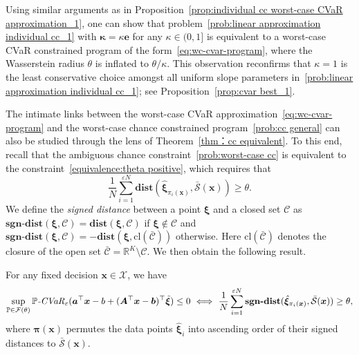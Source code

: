 \documentclass[nonblindrev]{informs2017}
\newcommand{\bmt}[1]{\tilde{\bm{#1}}}
\newcommand{\bmh}[1]{\hat{\bm{#1}}}
\newcommand{\1}[1]{\mathds{1}{\left(#1\right)}}
\begin{document}
\begin{remark}
Using similar arguments as in Proposition~\ref{prop:individual cc worst-case CVaR approximation_1}, one can show that problem~\eqref{prob:linear approximation individual cc_1} with $\bm \kappa=\kappa\bm e$ for any $\kappa\in (0,1]$ is equivalent to a worst-case CVaR constrained program of the form~\eqref{eq:wc-cvar-program}, where the Wasserstein radius $\theta$ is inflated to $\theta/\kappa$. This observation reconfirms that $\kappa=1$ is the least conservative choice amongst all uniform slope parameters in~\eqref{prob:linear approximation individual cc_1}; see Proposition~\ref{prop:cvar best_1}.
\end{remark}

The intimate links between the worst-case CVaR approximation~\eqref{eq:wc-cvar-program} and the worst-case chance constrained program~\eqref{prob:cc general} can also be studied through the lens of Theorem~\ref{thm：cc equivalent}. To this end, recall that the ambiguous chance constraint~\eqref{prob:worst-case cc} is equivalent to the constraint~\eqref{equivalence:theta positive}, which requires that
\begin{equation*}
\dfrac{1}{N}\sum_{i = 1}^{\varepsilon N} \mathbf{dist}(\bmh{\xi}_{\pi_i(\bm{x})}, \bar{\mathcal{S}}(\bm{x})) \ge \theta.
\end{equation*}
We define the \emph{signed distance} between a point $\bm{\xi}$ and a closed set $\mathcal{C}$ as $\mathbf{sgn\textbf{-}dist} (\bm{\xi}, \mathcal{C}) = \mathbf{dist} (\bm{\xi}, \mathcal{C})$ if $\bm{\xi} \notin \mathcal{C}$ and $\mathbf{sgn\textbf{-}dist} (\bm{\xi}, \mathcal{C}) = -\mathbf{dist} (\bm{\xi}, \text{cl}(\bar{\mathcal{C}}))$ otherwise. Here $\text{cl}(\bar{\mathcal{C}})$ denotes the closure of the open set $\bar{\mathcal{C}} = \mathbb{R}^K \setminus \mathcal{C}$. We then obtain the following result.

\begin{proposition}\label{prop:CVaR equivalence_1}
For any fixed decision $\bm{x} \in \mathcal{X}$, we have
$$
\sup_{\mathbb{P} \in \mathcal{F}(\theta)} \mathbb{P}\text{\emph{-CVaR}}_{\varepsilon}(\bm{a}^\top\bm{x} - b+ (\bm{A}^\top\bm{x}-\bm{b})^\top\bmt{\xi}) \leq 0
~\Longleftrightarrow~ 
\dfrac{1}{N}\sum_{i = 1}^{\varepsilon N} \mathbf{sgn\textbf{-}dist} (\bmh{\xi}_{\pi_i(\bm{x})}, \bar{\mathcal{S}}(\bm{x})) \ge \theta,
$$
where $\bm{\pi}(\bm{x})$ permutes the data points $\bmh{\xi}_i$ into ascending order of their signed distances to $\bar{\mathcal{S}}(\bm{x})$.
\end{proposition}
\end{document}
